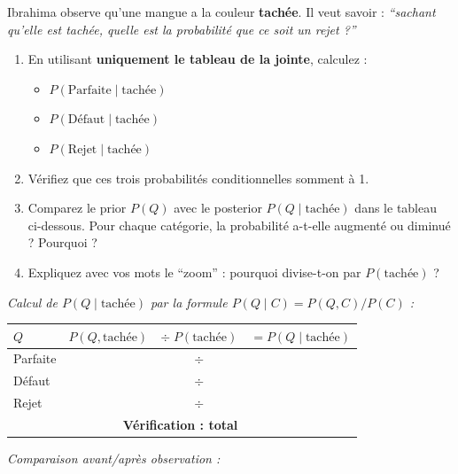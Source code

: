 \documentclass[11pt,a4paper]{article}
\begin{document}
\begin{exercicebox}[Énoncé]
Ibrahima observe qu'une mangue a la couleur \textbf{tachée}. Il veut savoir : \textit{``sachant qu'elle est tachée, quelle est la probabilité que ce soit un rejet ?''}

\begin{enumerate}
    \item En utilisant \textbf{uniquement le tableau de la jointe}, calculez :
    \begin{itemize}
        \item $P(\text{Parfaite} \mid \text{tachée})$
        \item $P(\text{Défaut} \mid \text{tachée})$
        \item $P(\text{Rejet} \mid \text{tachée})$
    \end{itemize}
    \item Vérifiez que ces trois probabilités conditionnelles somment à 1.
    \item Comparez le prior $P(Q)$ avec le posterior $P(Q \mid \text{tachée})$ dans le tableau ci-dessous. Pour chaque catégorie, la probabilité a-t-elle augmenté ou diminué ? Pourquoi ?
    \item Expliquez avec vos mots le ``zoom'' : pourquoi divise-t-on par $P(\text{tachée})$ ?
\end{enumerate}
\end{exercicebox}

\noindent\textit{Calcul de $P(Q \mid \text{tachée})$ par la formule $P(Q \mid C) = P(Q, C) / P(C)$ :}

\begin{center}
\renewcommand{\arraystretch}{2.2}
\begin{tabular}{|l|c|c|c|}
\hline
$Q$ & $P(Q, \text{tachée})$ & $\div \; P(\text{tachée})$ & $= P(Q \mid \text{tachée})$ \\
\hline
Parfaite & \hspace{2cm} & $\div$ \hspace{1.5cm} & \hspace{2cm} \\
\hline
Défaut & & $\div$ & \\
\hline
Rejet & & $\div$ & \\
\hline
\multicolumn{3}{|r|}{\textbf{Vérification : total}} & \\
\hline
\end{tabular}
\end{center}

\noindent\textit{Comparaison avant/après observation :}
\end{document}
